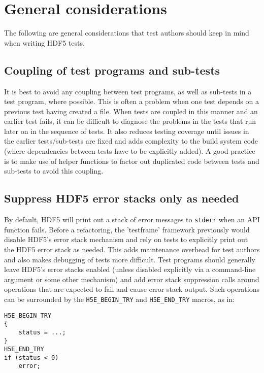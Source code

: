 \documentclass[../HDF5_RFC.tex]{subfiles}
\begin{document}
\section{General considerations}
\label{considerations}

The following are general considerations that test authors should keep in mind when writing HDF5 tests.

\subsection{Coupling of test programs and sub-tests}

It is best to avoid any coupling between test programs, as well as sub-tests in a test program, where possible. This is often a problem when one test depends on a previous test having created a file. When
tests are coupled in this manner and an earlier test fails, it can be difficult to diagnose the problems
in the tests that run later on in the sequence of tests. It also reduces testing coverage until issues
in the earlier tests/sub-tests are fixed and adds complexity to the build system code (where dependencies
between tests have to be explicitly added). A good practice is to make use of helper functions to factor
out duplicated code between tests and sub-tests to avoid this coupling.

\subsection{Suppress HDF5 error stacks only as needed}

By default, HDF5 will print out a stack of error messages to \texttt{stderr} when an API function fails.
Before a refactoring, the 'testframe' framework previously would disable HDF5's error stack mechanism
and rely on tests to explicitly print out the HDF5 error stack as needed. This adds maintenance overhead
for test authors and also makes debugging of tests more difficult. Test programs should generally leave
HDF5's error stacks enabled (unless disabled explicitly via a command-line argument or some other
mechanism) and add error stack suppression calls around operations that are expected to fail and cause
error stack output. Such operations can be surrounded by the \texttt{H5E\_BEGIN\_TRY} and
\texttt{H5E\_END\_TRY} macros, as in:

\begin{verbatim}
H5E_BEGIN_TRY
{
    status = ...;
}
H5E_END_TRY
if (status < 0)
    error;
\end{verbatim}
\end{document}
